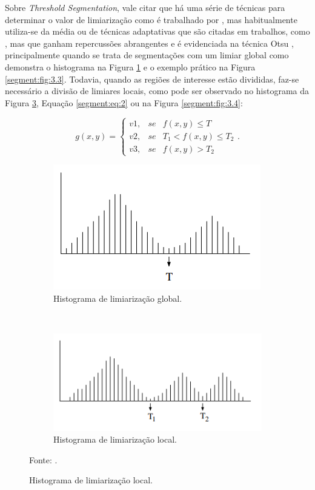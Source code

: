 Sobre \textit{Threshold Segmentation}, vale citar que há uma série de técnicas para determinar o valor de limiarização como é trabalhado por \cite{Al-amri2010}, mas habitualmente utiliza-se da média \cite{Al-amri2010, Yanowitz1989, Yuheng2017} ou de técnicas adaptativas que são citadas em trabalhos, como \cite{Yanowitz1989}, mas que ganham repercussões abrangentes e é evidenciada na técnica Otsu \cite{Otsu1979}, principalmente quando se trata de segmentações com um limiar global como demonstra o histograma na Figura \ref{segment:fig:2.1} e o exemplo prático na Figura  \ref{segment:fig:3.3}. Todavia, quando as regiões de interesse estão divididas, faz-se necessário a divisão de limiares locais, como pode ser observado no histograma da Figura \ref{segment:fig:2.2}, Equação \ref{segment:eq:2} ou na Figura \ref{segment:fig:3.4}:

\begin{equation}
\label{segment:eq:2}
    g(x,y) = \left\{\begin{matrix}
        v1, & se & f(x,y) \leq T \\ 
        v2, & se & T_1 < f(x,y) \leq T_2 \\
        v3, & se & f(x,y) > T_2
\end{matrix}\right..
\end{equation}

\begin{figure}[H]
   \caption{Histogramas de limiarizações.}
   \centering
   \label{segment:fig:2}
    \begin{subfigure}[t]{0.45\textwidth}
        \centering
        \includegraphics[width=0.5\linewidth]{recursos/imagens/image_seg/limi_glob.png}
        \caption{Histograma de limiarização global.}
        \label{segment:fig:2.1}
    \end{subfigure}%
    ~ 
    \begin{subfigure}[t]{0.45\textwidth}
        \centering
        \includegraphics[width=0.5\linewidth]{recursos/imagens/image_seg/limi_local.png}
        \caption{Histograma de limiarização local.}
        \label{segment:fig:2.2}
    \end{subfigure}%

    Fonte: \cite{pedrini2008analise}.
\end{figure}

